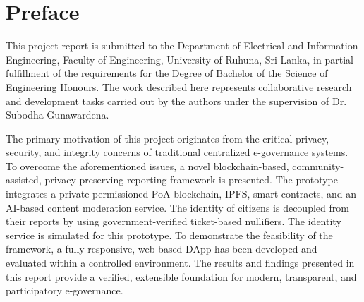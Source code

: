 
\chapter*{Preface} 

This project report is submitted to the Department of Electrical and Information Engineering, Faculty of Engineering, University of Ruhuna, Sri Lanka, in partial fulfillment of the requirements for the Degree of Bachelor of the Science of Engineering Honours. The work described here represents collaborative research and development tasks carried out by the authors under the supervision of Dr. Subodha Gunawardena. 

The primary motivation of this project originates from the critical privacy, security, and integrity concerns of traditional centralized e-governance systems. To overcome the aforementioned issues, a novel blockchain-based, community-assisted, privacy-preserving reporting framework is presented. The prototype integrates a private permissioned \ac{PoA} blockchain, \ac{IPFS}, smart contracts, and an \ac{AI}-based content moderation service. The identity of citizens is decoupled from their reports by using government-verified ticket-based nullifiers. The identity service is simulated for this prototype. To demonstrate the feasibility of the framework,  a fully responsive, web-based \ac{DApp} has been developed and evaluated within a controlled environment. The results and findings presented in this report provide a verified, extensible foundation for modern, transparent, and participatory e-governance.